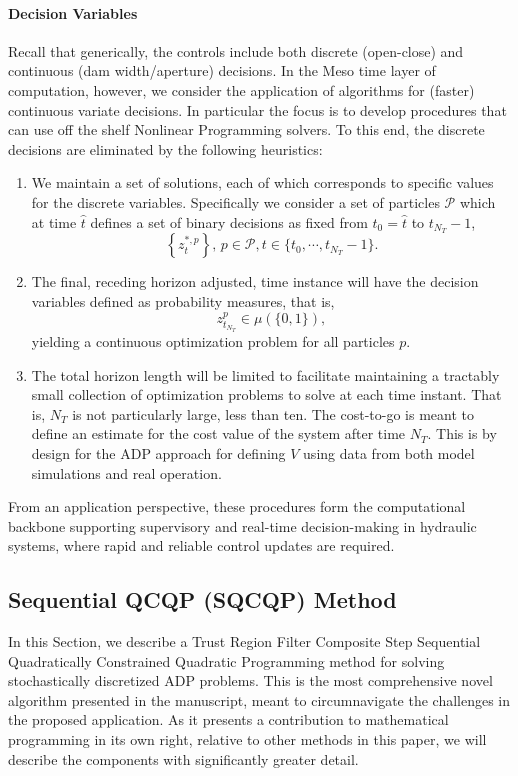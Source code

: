 \documentclass{article}
\newcommand{\1}{\mathds{1}}          %
\theoremstyle{definition}
\begin{document}
\begin{sloppypar}
\paragraph{Decision Variables}  Recall that generically, the controls include both discrete (open-close) and continuous (dam width/aperture) decisions. In the Meso time layer of computation, however, we consider the application of algorithms for (faster) continuous variate decisions. In particular the focus is to develop procedures that can use off the shelf Nonlinear Programming solvers. To this end, the discrete decisions are eliminated by the following heuristics:
\begin{enumerate}
    \item We maintain a set of solutions, each of which corresponds to specific values for the discrete variables. Specifically we consider a set of particles $\mathcal{P}$ which at time $\hat{t}$ defines a set of binary decisions as fixed from $t_0=\hat{t}$ to $t_{N_T}-1$,
\[
\left\{ z^{*,p}_{t}\right\},\,p\in\mathcal{P},t\in\{t_0,\cdots,t_{N_T}-1\}.
\]
    \item The final, receding horizon adjusted, time instance will have the decision variables defined as probability measures, that is, 
    \[
    z^p_{t_{N_T}}\in \mu(\{0,1\}),
    \]
    yielding a continuous optimization problem for all particles $p$.
    \item The total horizon length will be limited to facilitate maintaining a tractably small collection of optimization problems to solve at each time instant. That is, $N_T$ is not particularly large, less than ten. The cost-to-go is meant to define an estimate for the cost value of the system after time $N_T$. This is by design for the ADP approach for defining $V$ using data from both model simulations and real operation.
\end{enumerate}

From an application perspective, these procedures form the computational backbone supporting supervisory and real-time decision-making in hydraulic systems, where rapid and reliable control updates are required.


\subsection{Sequential QCQP (SQCQP) Method}

In this Section, we describe a Trust Region Filter Composite Step Sequential Quadratically Constrained Quadratic Programming method for solving stochastically discretized ADP problems. This is the most comprehensive novel algorithm presented in the manuscript, meant to circumnavigate the challenges in the proposed application. As it presents a contribution to mathematical programming in its own right, relative to other methods in this paper, we will describe the components with significantly greater detail. 


\end{sloppypar}
\end{document}
